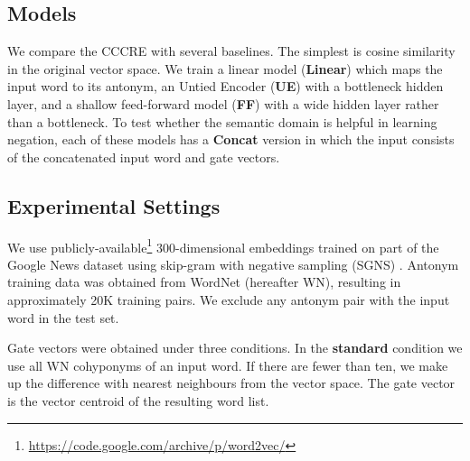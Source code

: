 \documentclass[11pt]{article}
\begin{document}
\subsection{Models}

We compare the CCCRE with several baselines. The simplest is cosine similarity in the original vector space. We train a linear model ({\bf Linear}) which maps the input word to its antonym, an Untied Encoder ({\bf UE}) with a bottleneck hidden layer, and a shallow feed-forward model ({\bf FF}) with a wide hidden layer rather than a bottleneck. To test whether the semantic domain is helpful in learning negation, each of these models has a {\bf Concat} version in which the input consists of the concatenated input word and gate vectors. 

\subsection{Experimental Settings}

We use publicly-available\footnote{\url{https://code.google.com/archive/p/word2vec/}} 300-dimensional embeddings trained on part of the Google News dataset using skip-gram with negative sampling (SGNS) \citep{mikolov:13}.
Antonym training data was obtained from WordNet \citep{wordnet} (hereafter WN), resulting in approximately 20K training pairs.
We exclude any antonym pair with the input word in the test set.

Gate vectors were obtained under three
conditions. In the {\bf standard} condition we use all WN cohyponyms
of an input word. If there are fewer than ten, we make up the
difference with nearest neighbours from the
vector space. The gate vector is 
the vector centroid of the resulting word list.


\end{document}
